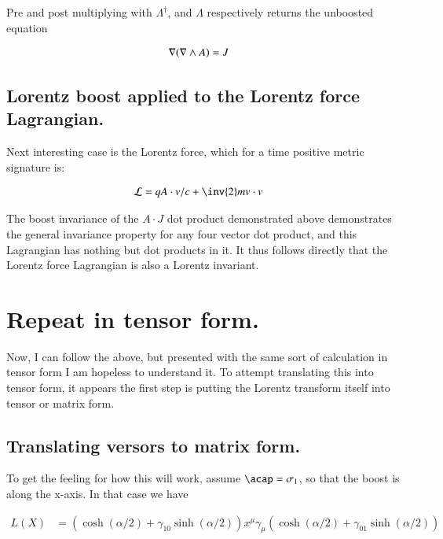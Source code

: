 \documentclass{article}
\begin{document}
Pre and post multiplying with $\Lambda^\dagger$, and $\Lambda$ respectively returns the unboosted equation

\begin{align*}
\nabla (\nabla \wedge A) &= J
\end{align*}

\subsection{ Lorentz boost applied to the Lorentz force Lagrangian. }

Next interesting case is the Lorentz force, which for a time positive metric 
signature is:

\begin{align*}
\LL &= q A \cdot v/c + \inv{2} m v \cdot v
\end{align*}

The boost invariance of the $A \cdot J$ dot product demonstrated above demonstrates the general invariance property for any four vector dot product, and this
Lagrangian has nothing but dot products in it.  It thus follows directly that the Lorentz force Lagrangian is also a Lorentz invariant.

\section{ Repeat in tensor form. }

Now, I can follow the above, but presented with the same sort of calculation in tensor form I am hopeless to understand it.  To attempt translating this
into tensor form, it appears the first step is putting the Lorentz transform itself into tensor or matrix form.

\subsection{ Translating versors to matrix form. }

To get the feeling for how this will work, assume $\acap = \sigma_1$, so that the boost is along the x-axis.  In that case we have

\begin{align*}
L(X)
&= (\cosh( \alpha/2 ) + \gamma_{10} \sinh( \alpha/2 )) x^\mu \gamma_\mu (\cosh( \alpha/2 ) + \gamma_{01} \sinh( \alpha/2 )) \\
\end{align*}
\end{document}
